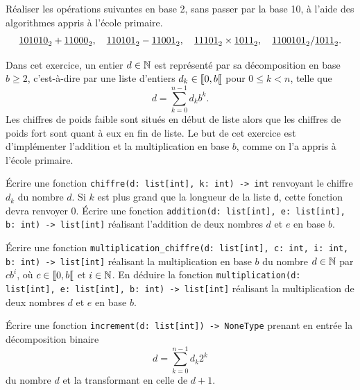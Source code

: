 \documentclass{magnolia}
\begin{document}


Réaliser les opérations suivantes en base 2, sans passer par la base 10, à l'aide des
algorithmes appris à l'école primaire.
\[\underline{101010}_2+\underline{11000}_2,\quad \underline{110101}_2-\underline{11001}_2,\quad \underline{11101}_2 \times \underline{1011}_2,\quad
  \underline{1100101}_2 / \underline{1011}_2.\]


Dans cet exercice, un entier $d\in\mathbb{N}$ est représenté par sa décomposition en base
$b\geq 2$, c'est-à-dire par une liste d'entiers $d_k\in\left\llbracket 0,b\right\llbracket$ pour $0\leq k<n$,
telle que
\[d=\sum_{k=0}^{n-1} d_k b^k.\]
Les chiffres de poids faible sont situés en début de liste alors que les chiffres
de poids fort sont quant à eux en fin de liste.  Le but de cet exercice est
d'implémenter l'addition et la multiplication en base $b$, comme on l'a appris à l'école
primaire.
\begin{questions}
\question Écrire une fonction \verb!chiffre(d: list[int], k: int) -> int! renvoyant
  le chiffre $d_k$ du nombre $d$. Si $k$ est plus grand que la longueur de
  la liste \verb!d!, cette fonction devra renvoyer 0.
\question Écrire une fonction
  \verb!addition(d: list[int], e: list[int], b: int) -> list[int]! réalisant l'addition
  de deux nombres $d$ et $e$ en base $b$.
\question
\begin{questions}
\question Écrire une fonction
  \verb!multiplication_chiffre(d: list[int], c: int, i: int, b: int) -> list[int]!
  réalisant la multiplication en base $b$ du nombre $d\in\mathbb{N}$ par $c b^i$, où
  $c\in\left\llbracket 0,b\right\llbracket$ et $i\in\mathbb{N}$.
\question En déduire la fonction \verb!multiplication(d: list[int], e: list[int], b: int) -> list[int]!
  réalisant la multiplication de deux nombres $d$ et $e$ en base $b$. 
\end{questions}
\end{questions}

Écrire une fonction \verb!increment(d: list[int]) -> NoneType! prenant en entrée la
décomposition binaire
\[d=\sum_{k=0}^{n-1} d_k 2^k\]
du nombre $d$ et la transformant en celle de $d+1$.
\end{document}
